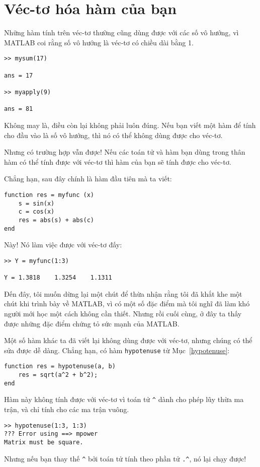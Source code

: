 \documentclass[12pt]{book}
\begin{document}
\section{Véc-tơ hóa hàm của bạn}

Những hàm tính trên véc-tơ thường cũng dùng được với các số
vô hướng, vì MATLAB coi rằng số vô hướng là véc-tơ có chiều dài
bằng 1.

\begin{verbatim}
>> mysum(17)

ans = 17

>> myapply(9)

ans = 81
\end{verbatim}
%
Không may là, điều còn lại không phải luôn đúng. Nếu bạn viết
một hàm để tính cho đầu vào là số vô hướng, thì nó có thể không
dùng được cho véc-tơ.

Nhưng có trường hợp vẫn được! Nếu các toán tử và hàm bạn dùng
trong thân hàm có thể tính được với véc-tơ thì hàm của bạn sẽ
tính được cho véc-tơ.

Chẳng hạn, sau đây chính là hàm đầu tiên mà ta viết:

\begin{verbatim}
function res = myfunc (x)
    s = sin(x)
    c = cos(x)
    res = abs(s) + abs(c)
end
\end{verbatim}
%
Này! Nó làm việc được với véc-tơ đấy:

\begin{verbatim}
>> Y = myfunc(1:3)

Y = 1.3818    1.3254    1.1311
\end{verbatim}
%
Đến đây, tôi muốn dừng lại một chút để thừa nhận rằng tôi đã
khắt khe một chút khi trình bày về MATLAB, vì có một số 
đặc điểm mà tôi nghĩ đã làm khó người mới học một cách
không cần thiết. Nhưng rồi cuối cùng, ở đây ta thấy được 
những đặc điểm chứng tỏ sức mạnh của MATLAB.

Một số hàm khác ta đã viết lại không dùng được với véc-tơ, nhưng
chúng có thể sửa được dễ dàng. Chẳng hạn, có hàm 
{\tt hypotenuse} từ Mục~\ref{hypotenuse}:

\begin{verbatim}
function res = hypotenuse(a, b)
    res = sqrt(a^2 + b^2);
end
\end{verbatim}
%
Hàm này không tính được với véc-tơ vì toán tử \verb+^+ 
dành cho phép lũy thừa ma trận, và chỉ tính cho các ma trận
vuông.

\begin{verbatim}
>> hypotenuse(1:3, 1:3)
??? Error using ==> mpower
Matrix must be square.
\end{verbatim}
%
Nhưng nếu bạn thay thế \verb+^+ bởi toán tử tính theo phần tử
\verb+.^+, nó lại chạy được!
\end{document}
